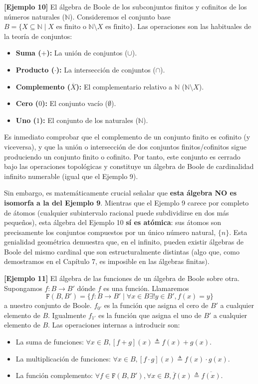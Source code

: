  \textbf{{[}Ejemplo 10{]}} El álgebra de Boole de los subconjuntos finitos y cofinitos de los números naturales ($\mathbb{N}$). Consideremos el conjunto base $B = \{ X \subseteq \mathbb{N} \mid X \text{ es finito o } \mathbb{N} \setminus X \text{ es finito} \}.$ Las operaciones son las habituales de la teoría de conjuntos:
  \begin{itemize}
      \item \textbf{Suma ($+$):} La unión de conjuntos ($\cup$).
      \item \textbf{Producto ($\cdot$):} La intersección de conjuntos ($\cap$).
      \item \textbf{Complemento ($\overline{X}$):} El complementario relativo a $\mathbb{N}$ ($\mathbb{N} \setminus X$).
      \item \textbf{Cero ($0$):} El conjunto vacío ($\emptyset$).
      \item \textbf{Uno ($1$):} El conjunto de los naturales ($\mathbb{N}$).
  \end{itemize}
  Es inmediato comprobar que el complemento de un conjunto finito es cofinito (y viceversa), y que la unión o intersección de dos conjuntos finitos/cofinitos sigue produciendo un conjunto finito o cofinito. Por tanto, este conjunto es cerrado bajo las operaciones topológicas y constituye un álgebra de Boole de cardinalidad infinito numerable (igual que el Ejemplo 9).

  Sin embargo, es matemáticamente crucial señalar que \textbf{esta álgebra NO es isomorfa a la del Ejemplo 9}. Mientras que el Ejemplo 9 carece por completo de átomos (cualquier subintervalo racional puede subdividirse en dos más pequeños), esta álgebra del Ejemplo 10 \textbf{sí es atómica}: sus átomos son precisamente los conjuntos compuestos por un único número natural, $\{n\}.$ Esta genialidad geométrica demuestra que, en el infinito, pueden existir álgebras de Boole del mismo cardinal que son estructuralmente distintas (algo que, como demostramos en el Capítulo 7, es imposible en las álgebras finitas).

  \textbf{{[}Ejemplo 11{]}} El álgebra de las funciones de un álgebra de
  Boole sobre otra. Supongamos $f: B \rightarrow B'$ dónde $f$ es una
  función. Llamaremos
  \[\mathtt{F}(B,B') = \{ f:B\rightarrow B' \mid \forall x \in B \exists! y \in B', f(x) = y \}\]
  a nuestro conjunto de Boole. $f_{0'}$ es la función que asigna el
  cero de $B'$ a cualquier elemento de $B.$ Igualmente $f_{1'}$ es
  la función que asigna el uno de $B'$ a cualquier elemento de $B.$
  Las operaciones internas a introducir son:
  \begin{itemize}
    \item La suma de funciones: $\forall x \in B, [f + g](x) \triangleq f(x) + g(x).$
    \item La multiplicación de funciones: $\forall x \in B, [f \cdot g](x) \triangleq f(x) \cdot g(x).$
    \item La función complemento: $\forall f \in \mathtt{F}(B,B'), \forall x \in B, \overline{f}(x) \triangleq \overline{f(x)}.$
  \end{itemize}

